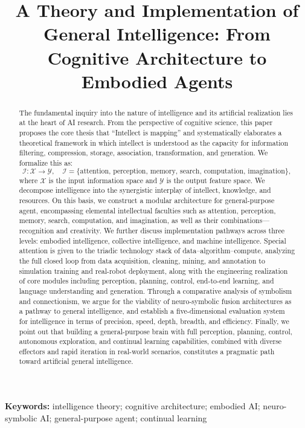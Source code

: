 \documentclass[12pt,a4paper]{article}
\title{A Theory and Implementation of General Intelligence: From Cognitive Architecture to Embodied Agents}
\author{}
\date{}
\begin{document}
\maketitle

\begin{abstract}
The fundamental inquiry into the nature of intelligence and its artificial realization lies at the heart of AI research. From the perspective of cognitive science, this paper proposes the core thesis that “Intellect is mapping” and systematically elaborates a theoretical framework in which intellect is understood as the capacity for information filtering, compression, storage, association, transformation, and generation. 
We formalize this as: 
\[
\mathcal{I}: \mathcal{X} \to \mathcal{Y}, \quad \mathcal{I} = \{ \text{attention, perception, memory, search, computation, imagination} \},
\]
where $\mathcal{X}$ is the input information space and $\mathcal{Y}$ is the output feature space. We decompose intelligence into the synergistic interplay of intellect, knowledge, and resources. On this basis, we construct a modular architecture for general-purpose agent, encompassing elemental intellectual faculties such as attention, perception, memory, search, computation, and imagination, as well as their combinations—recognition and creativity. We further discuss implementation pathways across three levels: embodied intelligence, collective intelligence, and machine intelligence. Special attention is given to the triadic technology stack of data–algorithm–compute, analyzing the full closed loop from data acquisition, cleaning, mining, and annotation to simulation training and real-robot deployment, along with the engineering realization of core modules including perception, planning, control, end-to-end learning, and language understanding and generation. Through a comparative analysis of symbolism and connectionism, we argue for the viability of neuro-symbolic fusion architectures as a pathway to general intelligence, and establish a five-dimensional evaluation system for intelligence in terms of precision, speed, depth, breadth, and efficiency. Finally, we point out that building a general-purpose brain with full perception, planning, control, autonomous exploration, and continual learning capabilities, combined with diverse effectors and rapid iteration in real-world scenarios, constitutes a pragmatic path toward artificial general intelligence.
\end{abstract}

\textbf{Keywords:} intelligence theory; cognitive architecture; embodied AI; neuro-symbolic AI; general-purpose agent; continual learning
\end{document}
